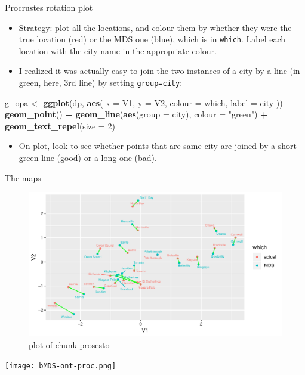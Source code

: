 \documentclass[ignorenonframetext,]{beamer}
\newenvironment{Shaded}{\begin{snugshade}}{\end{snugshade}}
\newcommand{\DataTypeTok}[1]{\textcolor[rgb]{0.13,0.29,0.53}{#1}}
\newcommand{\DecValTok}[1]{\textcolor[rgb]{0.00,0.00,0.81}{#1}}
\newcommand{\KeywordTok}[1]{\textcolor[rgb]{0.13,0.29,0.53}{\textbf{#1}}}
\newcommand{\NormalTok}[1]{#1}
\newcommand{\OperatorTok}[1]{\textcolor[rgb]{0.81,0.36,0.00}{\textbf{#1}}}
\newcommand{\StringTok}[1]{\textcolor[rgb]{0.31,0.60,0.02}{#1}}
\providecommand{\tightlist}{%
  \setlength{\itemsep}{0pt}\setlength{\parskip}{0pt}}
\begin{document}
\begin{frame}[fragile]{Procrustes rotation plot}
\protect\hypertarget{procrustes-rotation-plot}{}

\begin{itemize}
\item
  Strategy: plot all the locations, and colour them by whether they were
  the true location (red) or the MDS one (blue), which is in
  \texttt{which}. Label each location with the city name in the
  appropriate colour.
\item
  I realized it was actually easy to join the two instances of a city by
  a line (in green, here, 3rd line) by setting \texttt{group=city}:
\end{itemize}

\begin{Shaded}
\begin{Highlighting}[]
\NormalTok{g_opa <-}\StringTok{ }\KeywordTok{ggplot}\NormalTok{(dp, }\KeywordTok{aes}\NormalTok{(}
  \DataTypeTok{x =}\NormalTok{ V1, }\DataTypeTok{y =}\NormalTok{ V2, }\DataTypeTok{colour =}\NormalTok{ which,}
  \DataTypeTok{label =}\NormalTok{ city}
\NormalTok{)) }\OperatorTok{+}\StringTok{ }\KeywordTok{geom_point}\NormalTok{() }\OperatorTok{+}
\StringTok{  }\KeywordTok{geom_line}\NormalTok{(}\KeywordTok{aes}\NormalTok{(}\DataTypeTok{group =}\NormalTok{ city), }\DataTypeTok{colour =} \StringTok{"green"}\NormalTok{) }\OperatorTok{+}
\StringTok{  }\KeywordTok{geom_text_repel}\NormalTok{(}\DataTypeTok{size =} \DecValTok{2}\NormalTok{)}
\end{Highlighting}
\end{Shaded}

\begin{itemize}
\tightlist
\item
  On plot, look to see whether points that are same city are joined by a
  short green line (good) or a long one (bad).
\end{itemize}

\end{frame}

\begin{frame}{The maps}
\protect\hypertarget{the-maps}{}

\begin{figure}
\centering
\includegraphics{figure/prosesto-1.pdf}
\caption{plot of chunk prosesto}
\end{figure}

\texttt{[image: bMDS-ont-proc.png]}

\end{frame}
\end{document}
